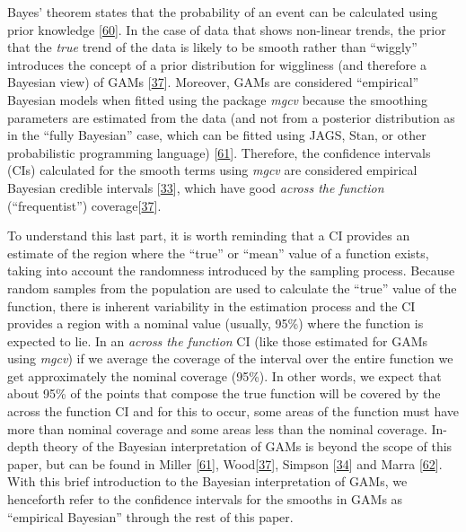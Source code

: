 \documentclass[
]{article}
\begin{document}
Bayes' theorem states that the probability of an event can be calculated using prior knowledge {[}\protect\hyperlink{ref-mcelreath2018}{60}{]}. In the case of data that shows non-linear trends, the prior that the \emph{true} trend of the data is likely to be smooth rather than ``wiggly'' introduces the concept of a prior distribution for wiggliness (and therefore a Bayesian view) of GAMs {[}\protect\hyperlink{ref-wood2017}{37}{]}. Moreover, GAMs are considered ``empirical'' Bayesian models when fitted using the package \emph{mgcv} because the smoothing parameters are estimated from the data (and not from a posterior distribution as in the ``fully Bayesian'' case, which can be fitted using JAGS, Stan, or other probabilistic programming language) {[}\protect\hyperlink{ref-miller2019}{61}{]}. Therefore, the confidence intervals (CIs) calculated for the smooth terms using \emph{mgcv} are considered empirical Bayesian credible intervals {[}\protect\hyperlink{ref-pedersen2019}{33}{]}, which have good \emph{across the function} (``frequentist'') coverage{[}\protect\hyperlink{ref-wood2017}{37}{]}.

To understand this last part, it is worth reminding that a CI provides an estimate of the region where the ``true'' or ``mean'' value of a function exists, taking into account the randomness introduced by the sampling process. Because random samples from the population are used to calculate the ``true'' value of the function, there is inherent variability in the estimation process and the CI provides a region with a nominal value (usually, 95\%) where the function is expected to lie. In an \emph{across the function} CI (like those estimated for GAMs using \emph{mgcv}) if we average the coverage of the interval over the entire function we get approximately the nominal coverage (95\%). In other words, we expect that about 95\% of the points that compose the true function will be covered by the across the function CI and for this to occur, some areas of the function must have more than nominal coverage and some areas less than the nominal coverage. In-depth theory of the Bayesian interpretation of GAMs is beyond the scope of this paper, but can be found in Miller {[}\protect\hyperlink{ref-miller2019}{61}{]}, Wood{[}\protect\hyperlink{ref-wood2017}{37}{]}, Simpson {[}\protect\hyperlink{ref-simpson2018}{34}{]} and Marra {[}\protect\hyperlink{ref-marra2012}{62}{]}. With this brief introduction to the Bayesian interpretation of GAMs, we henceforth refer to the confidence intervals for the smooths in GAMs as ``empirical Bayesian'' through the rest of this paper.
\end{document}
